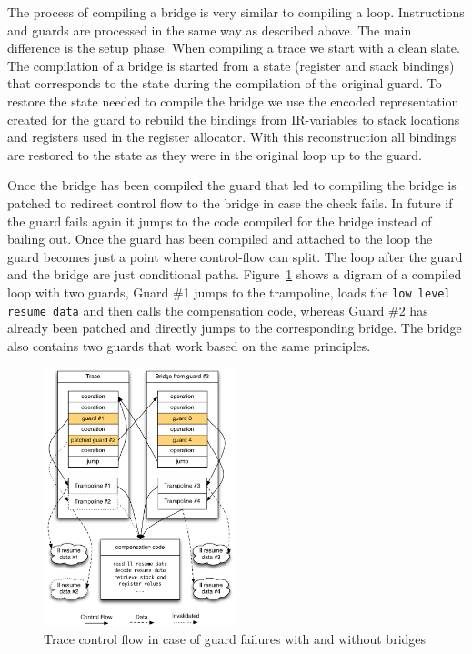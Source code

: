 \documentclass[10pt,preprint]{sigplanconf}
\begin{document}
The process of compiling a bridge is very similar to compiling a loop.
Instructions and guards are processed in the same way as described above. The
main difference is the setup phase. When compiling a trace we start with a clean
slate. The compilation of a bridge is started from a state (register and stack
bindings) that corresponds to the state during the compilation of the original
guard. To restore the state needed to compile the bridge we use the encoded
representation created for the guard to rebuild the bindings from IR-variables
to stack locations and registers used in the register allocator.  With this
reconstruction all bindings are restored to the state as they were in the
original loop up to the guard.

Once the bridge has been compiled the guard that led to compiling the bridge is
patched to redirect control flow to the bridge in case the check fails. In
future if the guard fails again it jumps to the code compiled for the bridge
instead of bailing out. Once the guard has been compiled and attached to the
loop the guard becomes just a point where control-flow can split. The loop
after the guard and the bridge are just conditional paths.
Figure~\ref{fig:trampoline} shows a digram of a compiled loop with two guards,
Guard \#1 jumps to the trampoline, loads the \texttt{low level resume data} and
then calls the compensation code, whereas Guard \#2 has already been patched
and directly jumps to the corresponding bridge. The bridge also contains two
guards that work based on the same principles.
\begin{figure}
\centering
\includegraphics[width=0.5\textwidth]{figures/loop_bridge.pdf}
\caption{Trace control flow in case of guard failures with and without bridges}
\label{fig:trampoline}
\end{figure}
\end{document}
